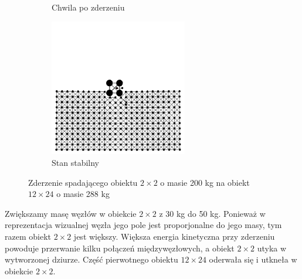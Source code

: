 \documentclass[12pt, letterpaper]{report}
\begin{document}
\begin{figure}[h]
\begin{subfigure}{0.5\textwidth}
            \caption{Chwila po zderzeniu}
        \end{subfigure}
        \begin{subfigure}{0.5\textwidth}
            \centering
            \includegraphics[width=6cm, height=6cm]{collision_2x2_24x12_mass50_4}
            \caption{Stan stabilny}
        \end{subfigure}
        
        \caption{Zderzenie spadającego obiektu $2 \times 2$ o masie 200 kg na obiekt $12 \times 24$ o masie 288 kg}
    \end{figure}

    Zwiększamy masę węzłów w obiekcie $2 \times 2$ z 30 kg do 50 kg. Ponieważ w reprezentacja wizualnej węzła jego pole 
    jest proporjonalne do jego masy, tym razem obiekt $2 \times 2$ jest większy.
    Większa energia kinetyczna przy zderzeniu powoduje przerwanie kilku połączeń międzywęzłowych, a obiekt $2 \times 2$ 
    utyka w wytworzonej dziurze. Część pierwotnego obiektu $12 \times 24$ oderwała się i utkneła w obiekcie $2 \times 2$.

    \newpage
\end{document}

